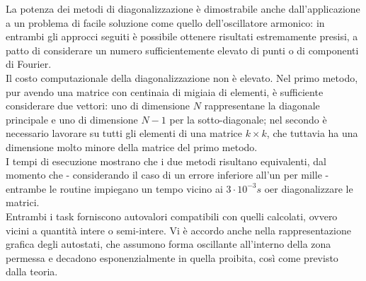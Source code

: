 \documentclass[a4paper,11pt]{article}
\begin{document}
La potenza dei metodi di diagonalizzazione è dimostrabile anche dall'applicazione a un problema di facile soluzione come quello dell'oscillatore armonico: in entrambi gli approcci seguiti è possibile ottenere risultati estremamente presisi, a patto di considerare un numero sufficientemente elevato di punti o di componenti di Fourier. \\
Il costo computazionale della diagonalizzazione non è elevato. Nel primo metodo, pur avendo una matrice con centinaia di migiaia di elementi, è sufficiente considerare due vettori: uno di dimensione $N$ rappresentane la diagonale principale e uno di dimensione $N-1$ per la sotto-diagonale; nel secondo è necessario lavorare su tutti gli elementi di una matrice $k \times k$, che tuttavia ha una dimensione molto minore della matrice del primo metodo.\\
I tempi di esecuzione mostrano che i due metodi risultano equivalenti, dal momento che \-- considerando il caso di un errore inferiore all'un per mille \-- entrambe le routine impiegano un tempo vicino ai $3 \cdot 10^{-3} s$ oer diagonalizzare le matrici.\\
Entrambi i task forniscono autovalori compatibili con quelli calcolati, ovvero vicini a quantità intere o semi-intere. Vi è accordo anche nella rappresentazione grafica degli autostati, che assumono forma oscillante all'interno della zona permessa e decadono esponenzialmente in quella proibita, così come previsto dalla teoria.
\end{document}
